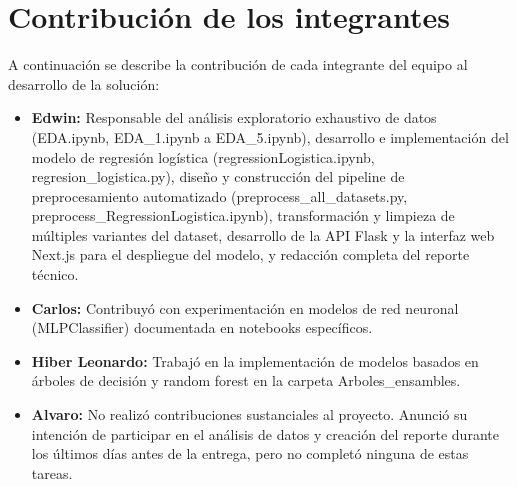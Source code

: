\documentclass{llncs}
\begin{document}
\section*{Contribución de los integrantes}

A continuación se describe la contribución de cada integrante del equipo al desarrollo de la solución:

\begin{itemize}
    \item \textbf{Edwin:} Responsable del análisis exploratorio exhaustivo de datos (EDA.ipynb, EDA\_1.ipynb a EDA\_5.ipynb), desarrollo e implementación del modelo de regresión logística (regressionLogistica.ipynb, regresion\_logistica.py), diseño y construcción del pipeline de preprocesamiento automatizado (preprocess\_all\_datasets.py, preprocess\_RegressionLogistica.ipynb), transformación y limpieza de múltiples variantes del dataset, desarrollo de la API Flask y la interfaz web Next.js para el despliegue del modelo, y redacción completa del reporte técnico.
    
    \item \textbf{Carlos:} Contribuyó con experimentación en modelos de red neuronal (MLPClassifier) documentada en notebooks específicos.
    
    \item \textbf{Hiber Leonardo:} Trabajó en la implementación de modelos basados en árboles de decisión y random forest en la carpeta Arboles\_ensambles.
    
    \item \textbf{Alvaro:} No realizó contribuciones sustanciales al proyecto. Anunció su intención de participar en el análisis de datos y creación del reporte durante los últimos días antes de la entrega, pero no completó ninguna de estas tareas.
\end{itemize}
\end{document}
